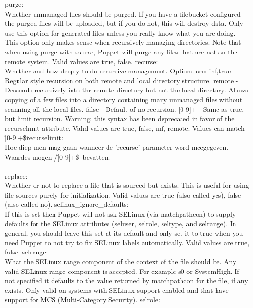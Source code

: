{purge:\\
Whether unmanaged files should be purged. If you have a filebucket configured the purged files will be uploaded, but if you do not, this will destroy data. Only use this option for generated files unless you really know what you are doing. This option only makes sense when recursively managing directories.
%
Note that when using purge with source, Puppet will purge any files that are not on the remote system. Valid values are true, false.
%
recurse:\\
Whether and how deeply to do recursive management. Options are:
%
inf,true - Regular style recursion on both remote and local directory structure.
remote - Descends recursively into the remote directory but not the local directory. Allows copying of a few files into a directory containing many unmanaged files without scanning all the local files.
false - Default of no recursion.
[0-9]+ - Same as true, but limit recursion. Warning: this syntax has been deprecated in favor of the recurselimit attribute. Valid values are true, false, inf, remote. Values can match \/\^[0-9]+\$\/\.
%
recurselimit:\\
Hoe diep men mag gaan wanneer de 'recurse' parameter word meegegeven. Waardes mogen /\^[0-9]+\$\/\ bevatten.\\\\
%
replace:\\
Whether or not to replace a file that is sourced but exists. This is useful for using file sources purely for initialization. Valid values are true (also called yes), false (also called no).
%
selinux\_ignore\_defaults:\\
If this is set then Puppet will not ask SELinux (via matchpathcon) to supply defaults for the SELinux attributes (seluser, selrole, seltype, and selrange). In general, you should leave this set at its default and only set it to true when you need Puppet to not try to fix SELinux labels automatically. Valid values are true, false.
%
selrange:\\
What the SELinux range component of the context of the file should be. Any valid SELinux range component is accepted. For example s0 or SystemHigh. If not specified it defaults to the value returned by matchpathcon for the file, if any exists. Only valid on systems with SELinux support enabled and that have support for MCS (Multi-Category Security).
%
selrole:\\
}
